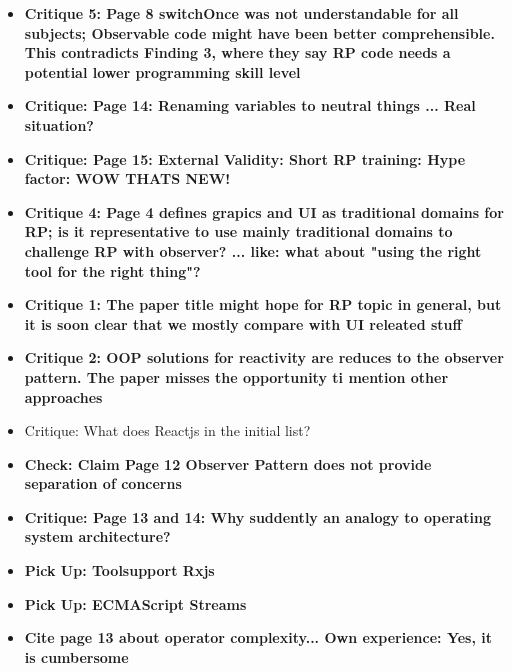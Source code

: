 \documentclass[12pt,a4paper]{article}
\begin{document}
\begin{itemize}
	\item \textbf{Critique 5: Page 8 switchOnce was not understandable for all subjects; Observable code might have been better comprehensible. This contradicts Finding 3, where they say RP code needs a potential lower programming skill level}
	\item \textbf{Critique: Page 14: Renaming variables to neutral things ... Real situation?}
	\item \textbf{Critique: Page 15: External Validity: Short RP training: Hype factor: WOW THATS NEW!}
\end{itemize}

\begin{itemize}
	\item \textbf{Critique 4: Page 4 defines grapics and UI as traditional domains for RP; is it representative to use mainly traditional domains to challenge RP with observer? ... like: what about "using the right tool for the right thing"?}
	\item \textbf{Critique 1: The paper title might hope for RP topic in general, but it is soon clear that we mostly compare with UI releated stuff}
	\item \textbf{Critique 2: OOP solutions for reactivity are reduces to the observer pattern. The paper misses the opportunity ti mention other approaches}
	\item Critique: What does Reactjs in the initial list?
\end{itemize}

\begin{itemize}
	\item \textbf{Check: Claim Page 12 Observer Pattern does not provide separation of concerns}
	\item \textbf{Critique: Page 13 and 14: Why suddently an analogy to operating system architecture?}
\end{itemize}


\begin{itemize}
	\item \textbf{Pick Up: Toolsupport Rxjs}
	\item \textbf{Pick Up: ECMAScript Streams}
	\item \textbf{Cite page 13 about operator complexity... Own experience: Yes, it is cumbersome}
\end{itemize}
\end{document}
